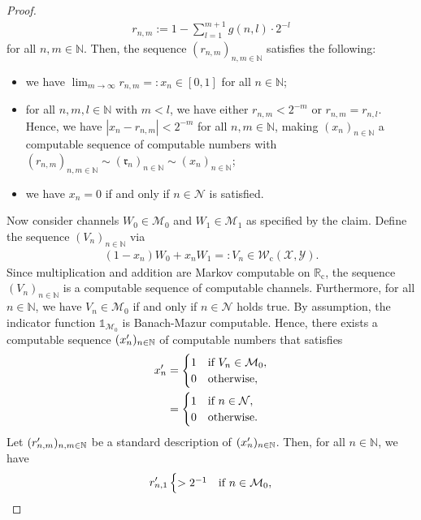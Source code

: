 \documentclass[conference]{IEEEtran}
\def\X{{\mathcal X}}
\def\Y{{\mathcal Y}}
\def\M{{\mathcal M}}
\def\N{{\mathcal N}}
\def\W{{\mathcal W}}
\def\NN{{\mathbb N}}
\def\RR{{\mathbb R}}
\newcommand{\RRc}{\RR_{\mathrm{c}}}
\newcommand{\xp}[1]{\mathrlap{\phantom{x}^{\prime}}x_{#1}}
\newcommand{\rp}[1]{\mathrlap{\phantom{r}^{\prime}}r_{#1}}
\newcommand{\Wc}{\W_{\mathrm{c}}}
\begin{document}
\begin{proof}
					\begin{align}	r_{n,m} := 1 - \sum_{l = 1}^{m+1} g(n,l)\cdot 2^{-l}
					\end{align}
					for all \(n,m\in\NN\). Then, the sequence \((r_{n,m})_{n,m\in\NN}\) satisfies the following:
					\begin{itemize}	\item	we have \(\lim_{m\to\infty} r_{n,m} =: x_n \in [0,1]\) for all \(n\in \NN\);
									\item	for all \(n,m,l\in\NN\) with \(m < l\), we have either \(r_{n,m} < 2^{-m}\) or   
											\(r_{n,m} = r_{n,l}\). Hence, we have \(|x_n - r_{n,m}| < 2^{-m}\) for all \(n,m\in\NN\),
											making \((x_n)_{n\in\NN}\) a computable sequence of computable numbers with 
											\((r_{n,m})_{n,m\in\NN} \sim (\mathfrak{r}_{n})_{n\in\NN} \sim (x_n)_{n\in\NN}\);
									\item 	we have \(x_n = 0\) if and only if \(n\in\N\) is satisfied. 
					\end{itemize}   
					Now consider channels \(W_0\in\M_0\) and \(W_1\in\M_1\) as specified by the claim. Define the sequence \((V_n)_{n\in\NN}\) via
					\begin{align}	(1-x_n)W_0 + x_n W_1 =: V_n \in \Wc(\X,\Y).
					\end{align}
					Since multiplication and addition are Markov computable on \(\RRc\), the sequence \((V_n)_{n\in\NN}\) is a computable
					sequence of computable channels. Furthermore, for all \(n\in\NN\), we have \(V_n \in \M_0\) if and only if \(n\in\N\) holds true. 
					By assumption, the indicator function \(\mathds{1}_{\M_0}\) is Banach-Mazur computable. Hence, there exists a computable sequence
					\((\xp{n})_{n\in\NN}\) of computable numbers that satisfies
					\begin{align}	\xp{n}	&= 	\begin{cases}	1	&\text{if}~ V_n \in \M_0, \\
																0 	&\text{otherwise},
												\end{cases} \\
											&=	\begin{cases}	1	&\text{if}~ n \in \N, \\
																0 	&\text{otherwise}.
												\end{cases} 
					\end{align}
					Let \((\rp{n,m})_{n,m\in\NN}\) be a standard description of \((\xp{n})_{n\in\NN}\). Then, for all \(n\in\NN\), we have
					\begin{align}	\rp{n,1} 	\begin{cases}	> 2^{-1}	&\text{if}~ n \in \M_0, \\

\end{cases}
\end{align}
\end{proof}
\end{document}
